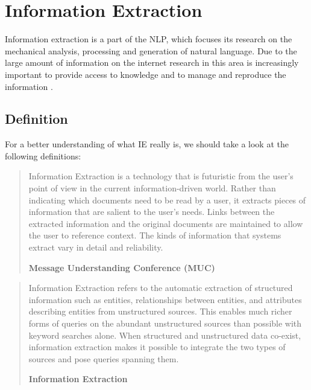\section{Information Extraction}
\label{sec:information-extraction}

Information extraction is a part of the \gls{NLP}, which focuses its research on the mechanical analysis, processing and generation of natural language. Due to the large amount of information on the internet research in this area is increasingly important to provide access to knowledge and to manage and reproduce the information \cite{Weinhofer:2010}\cite{Linsmayr:2010}.

\subsection{Definition}
For a better understanding of what \gls{IE} really is, we should take a look at the following definitions:

\begin{quote}
Information Extraction is a technology that is futuristic from the user's point of view in the current information-driven world. Rather than indicating which documents need to be read by a user, it extracts pieces of information that are salient to the user's needs. Links between the extracted information and the original documents are maintained to allow the user to reference context. The kinds of information that systems extract vary in detail and reliability.

\hfill \textbf{Message Understanding Conference (MUC)}

\hfill \citeauthor{Chinchor:2001} \cite{Chinchor:2001}
\end{quote}

\begin{quote}
Information Extraction refers to the automatic extraction of structured information such as entities, relationships between entities, and attributes describing entities from unstructured sources. This enables much richer forms of queries on the abundant unstructured sources than possible with keyword searches alone. When structured and unstructured data co-exist, information extraction makes it possible to integrate the two types of sources and pose queries spanning them.

\hfill \textbf{Information Extraction}

\hfill \citeauthor{Sarawagi:2008} \cite{Sarawagi:2008}
\end{quote}

